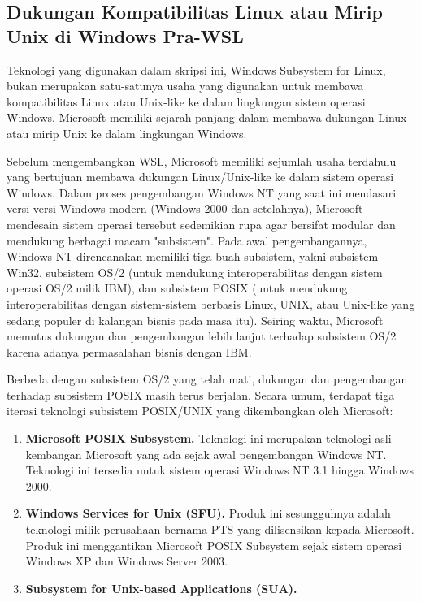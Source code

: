 \subsection{Dukungan Kompatibilitas Linux atau Mirip Unix di Windows Pra-WSL}

Teknologi yang digunakan dalam skripsi ini, Windows Subsystem for Linux, bukan merupakan satu-satunya usaha yang digunakan untuk membawa kompatibilitas Linux atau Unix-like ke dalam lingkungan sistem operasi Windows. Microsoft memiliki sejarah panjang dalam membawa dukungan Linux atau mirip Unix ke dalam lingkungan Windows.

Sebelum mengembangkan WSL, Microsoft memiliki sejumlah usaha terdahulu yang bertujuan membawa dukungan Linux/Unix-like ke dalam sistem operasi Windows. Dalam proses pengembangan Windows NT yang saat ini mendasari versi-versi Windows modern (Windows 2000 dan setelahnya), Microsoft mendesain sistem operasi tersebut sedemikian rupa agar bersifat modular dan mendukung berbagai macam "subsistem". Pada awal pengembangannya, Windows NT direncanakan memiliki tiga buah subsistem, yakni subsistem Win32, subsistem OS/2 (untuk mendukung interoperabilitas dengan sistem operasi OS/2 milik IBM), dan subsistem POSIX (untuk mendukung interoperabilitas dengan sistem-sistem berbasis Linux, UNIX, atau Unix-like yang sedang populer di kalangan bisnis pada masa itu). Seiring waktu, Microsoft memutus dukungan dan pengembangan lebih lanjut terhadap subsistem OS/2 karena adanya permasalahan bisnis dengan IBM.

Berbeda dengan subsistem OS/2 yang telah mati, dukungan dan pengembangan terhadap subsistem POSIX masih terus berjalan. Secara umum, terdapat tiga iterasi teknologi subsistem POSIX/UNIX yang dikembangkan oleh Microsoft:

\begin{enumerate}
    \item \textbf{Microsoft POSIX Subsystem.} Teknologi ini merupakan teknologi asli kembangan Microsoft yang ada sejak awal pengembangan Windows NT. Teknologi ini tersedia untuk sistem operasi Windows NT 3.1 hingga Windows 2000.
    \item \textbf{Windows Services for Unix (SFU).} Produk ini sesungguhnya adalah teknologi milik perusahaan bernama PTS yang dilisensikan kepada Microsoft. Produk ini menggantikan Microsoft POSIX Subsystem sejak sistem operasi Windows XP dan Windows Server 2003.
    \item \textbf{Subsystem for Unix-based Applications (SUA).}
\end{enumerate}

